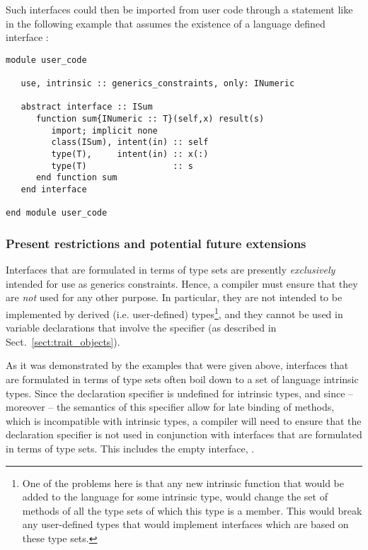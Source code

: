 \documentclass[11pt,oneside]{report}
\newcommand{\code}[1]{{\selectfont\ttfamily{#1}}}
\begin{document}
Such interfaces could then be imported from user code through a
\code{use} statement like in the following example that assumes the
existence of a language defined interface \code{INumeric}:
\begin{lstlisting}[language=LFortran,style=boxed]
module user_code

   use, intrinsic :: generics_constraints, only: INumeric

   abstract interface :: ISum
      function sum{INumeric :: T}(self,x) result(s)
         import; implicit none
         class(ISum), intent(in) :: self
         type(T),     intent(in) :: x(:)
         type(T)                 :: s
      end function sum
   end interface

end module user_code
\end{lstlisting}

\subsubsection{Present restrictions and potential future extensions}
\label{sect:future_extensions}

Interfaces that are formulated in terms of type sets are presently
\emph{exclusively} intended for use as generics constraints. Hence, a
compiler must ensure that they are \emph{not} used for any other
purpose. In particular, they are not intended to be implemented by
derived (i.e. user-defined) types\footnote{One of the problems here is
that any new intrinsic function that would be added to the language
for some intrinsic type, would change the set of methods of all the
type sets of which this type is a member. This would break any
user-defined types that would implement interfaces which are based on
these type sets.}, and they cannot be used in variable declarations
that involve the \code{class} specifier (as described in
Sect.~\ref{sect:trait_objects}).

As it was demonstrated by the examples that were given above,
interfaces that are formulated in terms of type sets often boil down
to a set of language intrinsic types. Since the \code{class}
declaration specifier is undefined for intrinsic types, and since --
moreover -- the semantics of this specifier allow for late binding of
methods, which is incompatible with intrinsic types, a compiler will
need to ensure that the \code{class} declaration specifier is not used
in conjunction with interfaces that are formulated in terms of type
sets. This includes the empty interface, \code{IAnyType}.
\end{document}
